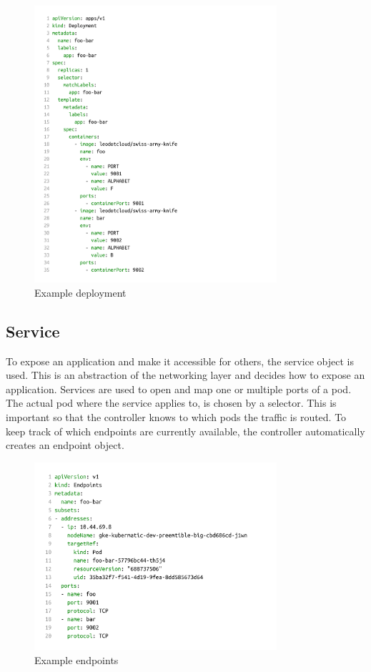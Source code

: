 \begin{figure}[H]
    \centering
    \includegraphics[width=0.8\textwidth, left]{media/02/deployment}
    \caption{Example deployment}
    \label{fig:deployment}
\end{figure}


\subsection{Service}\label{subsec:service}
To expose an application and make it accessible for others, the service object is used.
This is an abstraction of the networking layer and decides how to expose an application.
Services are used to open and map one or multiple ports of a pod.
The actual pod where the service applies to, is chosen by a selector.
This is important so that the controller knows to which pods the traffic is routed.
To keep track of which endpoints are currently available, the controller automatically creates an endpoint object.

\begin{figure}[H]
    \centering
    \includegraphics[width=0.8\textwidth, left]{media/02/endpoint}
    \caption{Example endpoints}
    \label{fig:endpoints}
\end{figure}

